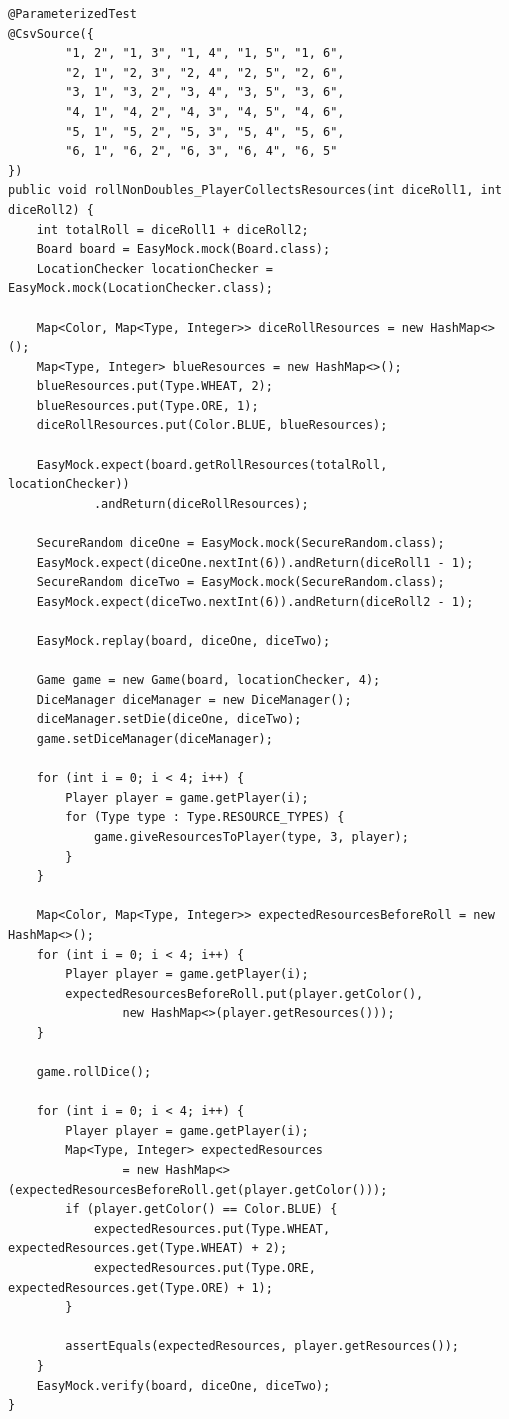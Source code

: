 \documentclass{fank1basedocument}
\begin{document}
\begin{lstlisting}[style=javacode,language=myJava]
@ParameterizedTest
@CsvSource({
		"1, 2", "1, 3", "1, 4", "1, 5", "1, 6",
		"2, 1", "2, 3", "2, 4", "2, 5", "2, 6",
		"3, 1", "3, 2", "3, 4", "3, 5", "3, 6",
		"4, 1", "4, 2", "4, 3", "4, 5", "4, 6",
		"5, 1", "5, 2", "5, 3", "5, 4", "5, 6",
		"6, 1", "6, 2", "6, 3", "6, 4", "6, 5"
})
public void rollNonDoubles_PlayerCollectsResources(int diceRoll1, int diceRoll2) {
	int totalRoll = diceRoll1 + diceRoll2;
	Board board = EasyMock.mock(Board.class);
	LocationChecker locationChecker = EasyMock.mock(LocationChecker.class);

	Map<Color, Map<Type, Integer>> diceRollResources = new HashMap<>();
	Map<Type, Integer> blueResources = new HashMap<>();
	blueResources.put(Type.WHEAT, 2);
	blueResources.put(Type.ORE, 1);
	diceRollResources.put(Color.BLUE, blueResources);

	EasyMock.expect(board.getRollResources(totalRoll, locationChecker))
			.andReturn(diceRollResources);

	SecureRandom diceOne = EasyMock.mock(SecureRandom.class);
	EasyMock.expect(diceOne.nextInt(6)).andReturn(diceRoll1 - 1);
	SecureRandom diceTwo = EasyMock.mock(SecureRandom.class);
	EasyMock.expect(diceTwo.nextInt(6)).andReturn(diceRoll2 - 1);

	EasyMock.replay(board, diceOne, diceTwo);

	Game game = new Game(board, locationChecker, 4);
	DiceManager diceManager = new DiceManager();
	diceManager.setDie(diceOne, diceTwo);
	game.setDiceManager(diceManager);

	for (int i = 0; i < 4; i++) {
		Player player = game.getPlayer(i);
		for (Type type : Type.RESOURCE_TYPES) {
			game.giveResourcesToPlayer(type, 3, player);
		}
	}

	Map<Color, Map<Type, Integer>> expectedResourcesBeforeRoll = new HashMap<>();
	for (int i = 0; i < 4; i++) {
		Player player = game.getPlayer(i);
		expectedResourcesBeforeRoll.put(player.getColor(),
				new HashMap<>(player.getResources()));
	}

	game.rollDice();

	for (int i = 0; i < 4; i++) {
		Player player = game.getPlayer(i);
		Map<Type, Integer> expectedResources
				= new HashMap<>(expectedResourcesBeforeRoll.get(player.getColor()));
		if (player.getColor() == Color.BLUE) {
			expectedResources.put(Type.WHEAT, expectedResources.get(Type.WHEAT) + 2);
			expectedResources.put(Type.ORE, expectedResources.get(Type.ORE) + 1);
		}

		assertEquals(expectedResources, player.getResources());
	}
	EasyMock.verify(board, diceOne, diceTwo);
}
\end{lstlisting}
\end{document}
